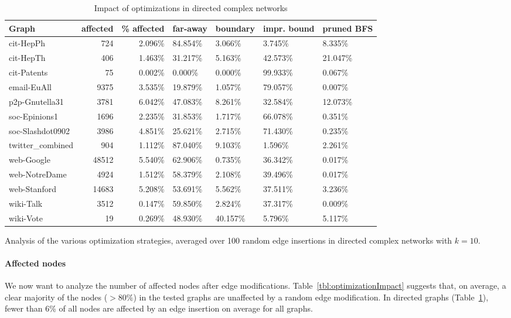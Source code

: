 \begin{table}[h!]
	\begin{tabular}{lrrllll}
\hline
 Graph            &   affected &   \% affected & far-away   & boundary   & impr. bound   & pruned BFS   \\
\hline
 cit-HepPh        &        724 & 2.096\%  & 84.854\%    & 3.066\%     & 3.745\%        & 8.335\%   \\
 cit-HepTh        &        406 & 1.463\%  & 31.217\%    & 5.163\%     & 42.573\%       & 21.047\%  \\
 cit-Patents      &         75 & 0.002\%  & 0.000\%     & 0.000\%     & 99.933\%       & 0.067\%   \\
 email-EuAll      &       9375 & 3.535\%  & 19.879\%    & 1.057\%     & 79.057\%       & 0.007\%   \\
 p2p-Gnutella31   &       3781 & 6.042\%  & 47.083\%    & 8.261\%     & 32.584\%       & 12.073\%  \\
 soc-Epinions1    &       1696 & 2.235\%  & 31.853\%    & 1.717\%     & 66.078\%       & 0.351\%   \\
 soc-Slashdot0902 &       3986 & 4.851\%  & 25.621\%    & 2.715\%     & 71.430\%       & 0.235\%   \\
 twitter\_combined &        904 & 1.112\%  & 87.040\%    & 9.103\%     & 1.596\%        & 2.261\%   \\
 web-Google       &      48512 & 5.540\%  & 62.906\%    & 0.735\%     & 36.342\%       & 0.017\%   \\
 web-NotreDame    &       4924 & 1.512\%  & 58.379\%    & 2.108\%     & 39.496\%       & 0.017\%   \\
 web-Stanford     &      14683 & 5.208\%  & 53.691\%    & 5.562\%     & 37.511\%       & 3.236\%   \\
 wiki-Talk        &       3512 & 0.147\%  & 59.850\%    & 2.824\%     & 37.317\%       & 0.009\%   \\
 wiki-Vote        &         19 & 0.269\%  & 48.930\%    & 40.157\%    & 5.796\%        & 5.117\%   \\
\hline
\end{tabular}
\caption{Impact of optimizations in directed complex networks}{Analysis of the various optimization strategies, averaged over 100 random edge insertions in directed complex networks with $k = 10$.}
\label{tbl:optimizationImpactDirected}
\end{table}

\paragraph{Affected nodes}
We now want to analyze the number of affected nodes after edge modifications. Table~\ref{tbl:optimizationImpact} suggests that, on average, a clear majority of the nodes ($> 80\%$) in the tested graphs are unaffected by a random edge modification. In directed graphs (Table~\ref{tbl:optimizationImpactDirected}), fewer than 6\% of all nodes are affected by an edge insertion on average for all graphs.

